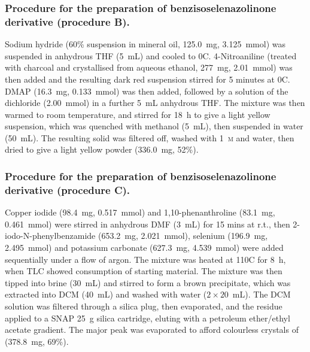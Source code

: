 \begin{refsection}
\subsubsection[General procedure B]{Procedure for the preparation of benzisoselenazolinone derivative  (procedure B).}
Sodium hydride (60\% suspension in mineral oil, 125.0~mg, 3.125~mmol) was suspended in anhydrous THF (5~mL) and cooled to 0\degree{}C.
4-Nitroaniline (treated with charcoal and crystallised from aqueous ethanol, 277~mg, 2.01~mmol) was then added and the resulting dark red suspension stirred for 5 minutes at 0\degree{}C.
DMAP (16.3~mg, 0.133~mmol) was then added, followed by a solution of the dichloride  (2.00~mmol) in a further 5~mL anhydrous THF.\@
The mixture was then warmed to room temperature, and stirred for 18~h to give a light yellow suspension, which was quenched with methanol (5~mL), then suspended in water (50~mL).
The resulting solid was filtered off, washed with 1~\textsc{m}  and water, then dried to give a light yellow powder (336.0~mg, 52\%).

\subsubsection[General procedure C]{Procedure for the preparation of benzisoselenazolinone derivative  (procedure C).}
Copper iodide (98.4~mg, 0.517~mmol) and 1,10-phenanthroline (83.1~mg, 0.461~mmol) were stirred in anhydrous DMF (3~mL) for 15 mins at r.t., then 2-iodo-N-phenylbenz\-amide (653.2~mg, 2.021~mmol), selenium (196.9~mg, 2.495~mmol) and potassium carbonate (627.3~mg, 4.539~mmol) were added sequentially under a flow of argon.
The mixture was heated at 110\degree{}C for 8~h, when TLC showed consumption of starting material.
The mixture was then tipped into brine (30~mL) and stirred to form a brown precipitate, which was extracted into DCM (40~mL) and washed with water ($ 2 \times 20 $~mL).
The DCM solution was filtered through a silica plug, then evaporated, and the residue applied to a SNAP 25~g silica cartridge, eluting with a petroleum ether/ethyl acetate gradient.
The major peak was evaporated to afford colourless crystals of  (378.8~mg, 69\%).


\end{refsection}
